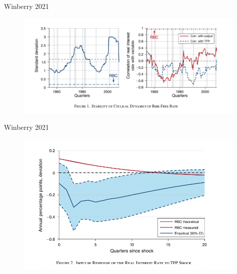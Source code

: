 \documentclass[english,xcolor=svgnames,aspectratio=169]{beamer}
\begin{document}
\begin{frame}{Winberry 2021}
\begin{figure}
\includegraphics[scale=0.45]{figures/w_1}
\end{figure}
\end{frame}


\begin{frame}{Winberry 2021}
\begin{figure}
\includegraphics[scale=0.45]{figures/w_2}
\end{figure}
\end{frame}
\end{document}
